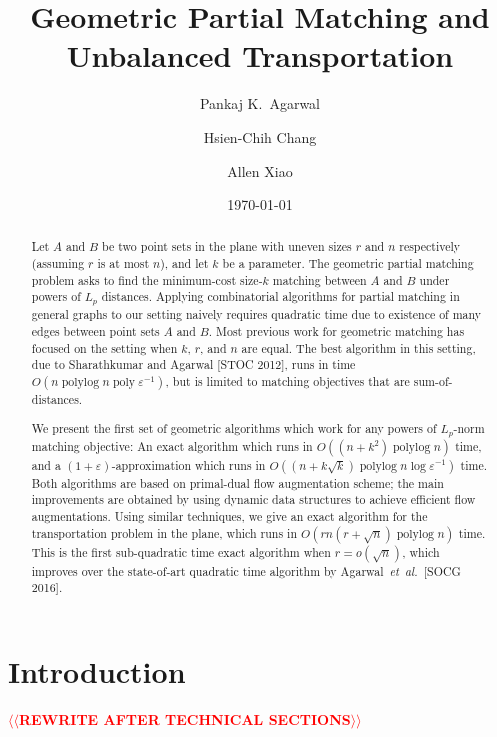 \documentclass[a4paper,UKenglish]{socg-lipics-v2018}
\title{Geometric Partial Matching and Unbalanced Transportation}
\author{Pankaj K.\ Agarwal}{Duke Univeristy, USA}{pankaj@cs.duke.edu}{}{}
\author{Hsien-Chih Chang}{Duke Univeristy, USA}{hsienchih.chang@duke.edu}{}{}
\author{Allen Xiao}{Duke Univeristy, USA}{axiao@cs.duke.edu}{}{}
\date{\today}
\makeatletter
\def\note#1{\textcolor{red}{{#1}}}
\def\etal{\emph{et~al.}}
\def\etal{\textit{et~al.}}
\def\poly{\mathop{\mathrm{poly}}}
\def\polylog{\mathop{\mathrm{polylog}}}
\def\eps{\varepsilon}
\theoremstyle{plain}
\numberwithin{figure}{section}
\def\n@te#1{\textsf{\boldmath \textbf{$\langle\!\langle$#1$\rangle\!\rangle$}}\leavevmode}
\def\note#1{\textcolor{red}{\n@te{#1}}}
\makeatother
\begin{document}
\maketitle

\begin{abstract}
Let $A$ and $B$ be two point sets in the plane with uneven sizes $r$ and $n$ respectively (assuming $r$ is at most $n$), and let $k$ be a parameter. The geometric partial matching problem asks to find the minimum-cost size-$k$ matching between $A$ and $B$ under powers of $L_p$ distances. Applying combinatorial algorithms for partial matching in general graphs to our setting naively requires quadratic time due to existence of many edges between point sets $A$ and $B$. Most previous work for geometric matching has focused on the setting when $k$, $r$, and $n$ are equal.  The best algorithm in this setting, due to Sharathkumar and Agarwal [STOC 2012], runs in time $O(n\polylog n \poly\eps^{-1})$, but is limited to matching objectives that are sum-of-distances.

We present the first set of geometric algorithms which work for any powers of $L_p$-norm matching objective:  An exact algorithm which runs in $O((n + k^2)\polylog n)$ time, and a $(1 + \eps)$-approximation which runs in $O((n + k\sqrt{k})\polylog n \log\eps^{-1})$ time.  Both algorithms are based on primal-dual flow augmentation scheme; the main improvements are obtained by using dynamic data structures to achieve efficient flow augmentations.
Using similar techniques, we give an exact algorithm for the transportation problem in the plane, which runs in $O(rn(r + \sqrt{n})\polylog n)$ time.
This is the first sub-quadratic time exact algorithm when $r = o(\sqrt{n})$, which improves over the state-of-art quadratic time algorithm by Agarwal~\etal\ [SOCG 2016].
\end{abstract}


\section{Introduction}

\note{REWRITE AFTER TECHNICAL SECTIONS}
\end{document}
